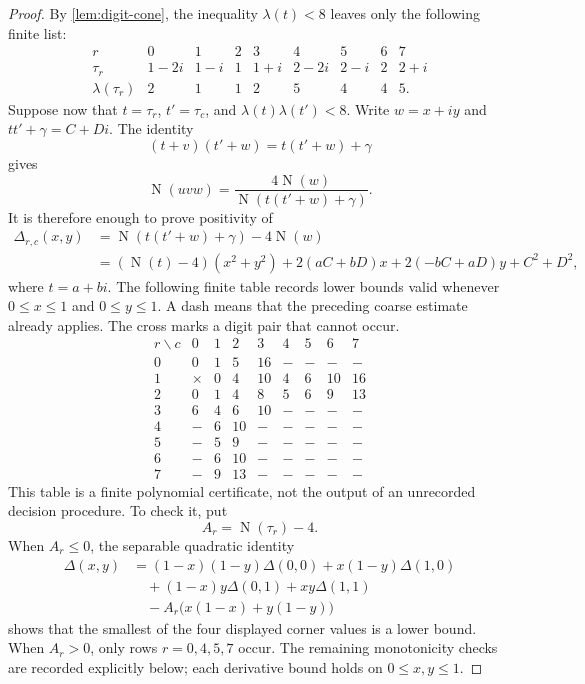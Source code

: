 \documentclass[10pt]{article}
\theoremstyle{definition}
\theoremstyle{remark}
\newcommand{\Norm}{\operatorname{N}}
\begin{document}
\begin{proof}
By \autoref{lem:digit-cone}, the inequality $\lambda(t)<8$ leaves only the following finite list:
\[
 \begin{array}{c|cccccccc}
 r&0&1&2&3&4&5&6&7\\ \hline
 \tau_r&1-2i&1-i&1&1+i&2-2i&2-i&2&2+i\\
 \lambda(\tau_r)&2&1&1&2&5&4&4&5.
 \end{array}
\]
Suppose now that $t=\tau_r$, $t'=\tau_c$, and $\lambda(t)\lambda(t')<8$.  Write $w=x+iy$ and $tt'+\gamma=C+Di$.  The identity
\[
 (t+v)(t'+w)=t(t'+w)+\gamma
\]
gives
\[
 \Norm(uvw)=\frac{4\Norm(w)}{\Norm(t(t'+w)+\gamma)}.
\]
It is therefore enough to prove positivity of
\[
 \begin{aligned}
 \Delta_{r,c}(x,y)
 &=\Norm(t(t'+w)+\gamma)-4\Norm(w)\\
 &=(\Norm(t)-4)(x^2+y^2)
   +2(aC+bD)x+2(-bC+aD)y+C^2+D^2,
 \end{aligned}
\]
where $t=a+bi$.  The following finite table records lower bounds valid whenever $0\le x\le1$ and $0\le y\le1$.  A dash means that the preceding coarse estimate already applies.  The cross marks a digit pair that cannot occur.
\[
\renewcommand{\arraystretch}{1.15}
\begin{array}{c|rrrrrrrr}
 r\backslash c&0&1&2&3&4&5&6&7\\ \hline
0&0&1&5&16&-&-&-&-\\
1&\times&0&4&10&4&6&10&16\\
2&0&1&4&8&5&6&9&13\\
3&6&4&6&10&-&-&-&-\\
4&-&6&10&-&-&-&-&-\\
5&-&5&9&-&-&-&-&-\\
6&-&6&10&-&-&-&-&-\\
7&-&9&13&-&-&-&-&-
\end{array}
\tag{5.1}
\]
This table is a finite polynomial certificate, not the output of an unrecorded decision procedure.  To check it, put
\[
 A_r=\Norm(\tau_r)-4.
\]
When $A_r\le0$, the separable quadratic identity
\[
 \begin{aligned}
 \Delta(x,y)
 &= (1-x)(1-y)\Delta(0,0)+x(1-y)\Delta(1,0)\\
 &\quad +(1-x)y\Delta(0,1)+xy\Delta(1,1)\\
 &\quad -A_r\bigl(x(1-x)+y(1-y)\bigr)
 \end{aligned}
\]
shows that the smallest of the four displayed corner values is a lower bound.  When $A_r>0$, only rows $r=0,4,5,7$ occur.  The remaining monotonicity checks are recorded explicitly below; each derivative bound holds on $0\le x,y\le1$.

\end{proof}
\end{document}
